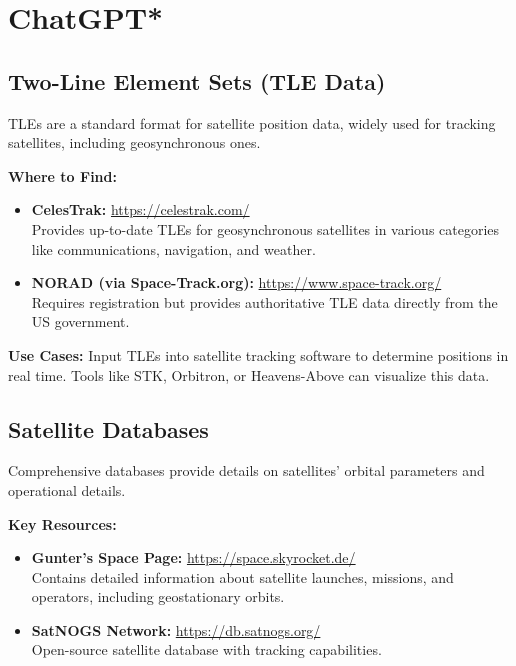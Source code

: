 % 

\section{ChatGPT*}

\subsection{Two-Line Element Sets (TLE Data)}
TLEs are a standard format for satellite position data, widely used for tracking satellites, including geosynchronous ones.

\textbf{Where to Find:}
\begin{itemize}
    \item \textbf{CelesTrak:} \href{https://celestrak.com/}{https://celestrak.com/} \\
    Provides up-to-date TLEs for geosynchronous satellites in various categories like communications, navigation, and weather.
    \item \textbf{NORAD (via Space-Track.org):} \href{https://www.space-track.org/}{https://www.space-track.org/} \\
    Requires registration but provides authoritative TLE data directly from the US government.
\end{itemize}

\textbf{Use Cases:}
Input TLEs into satellite tracking software to determine positions in real time. Tools like STK, Orbitron, or Heavens-Above can visualize this data.

\subsection{Satellite Databases}
Comprehensive databases provide details on satellites' orbital parameters and operational details.

\textbf{Key Resources:}
\begin{itemize}
    \item \textbf{Gunter's Space Page:} \href{https://space.skyrocket.de/}{https://space.skyrocket.de/} \\
    Contains detailed information about satellite launches, missions, and operators, including geostationary orbits.
    \item \textbf{SatNOGS Network:} \href{https://db.satnogs.org/}{https://db.satnogs.org/} \\
    Open-source satellite database with tracking capabilities.
\end{itemize}

